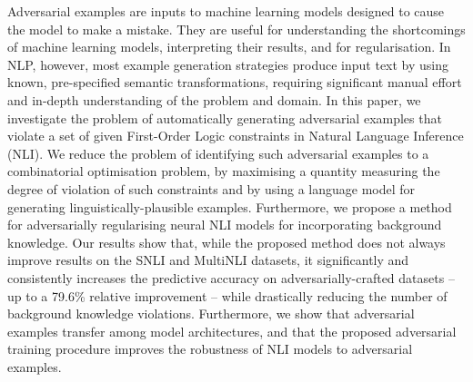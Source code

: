 Adversarial examples are inputs to machine learning models designed to cause the model to make a mistake. They are useful for understanding the shortcomings of machine learning models, interpreting their results, and for regularisation. In NLP, however, most example generation strategies produce input text by using known, pre-specified semantic transformations, requiring significant manual effort and in-depth understanding of the problem and domain. In this paper, we investigate the problem of automatically generating adversarial examples that violate a set of given First-Order Logic constraints in Natural Language Inference (NLI). We reduce the problem of identifying such adversarial examples to a combinatorial optimisation problem, by maximising a quantity measuring the degree of violation of such constraints and by using a language model for generating linguistically-plausible examples. Furthermore, we propose a method for adversarially regularising neural NLI models for incorporating background knowledge. Our results show that, while the proposed method does not always improve results on the SNLI and MultiNLI datasets, it significantly and consistently increases the predictive accuracy on adversarially-crafted datasets -- up to a 79.6\% relative improvement -- while drastically reducing the number of background knowledge violations. Furthermore, we show that adversarial examples transfer among model architectures, and that the proposed adversarial training procedure improves the robustness of NLI models to adversarial examples.
